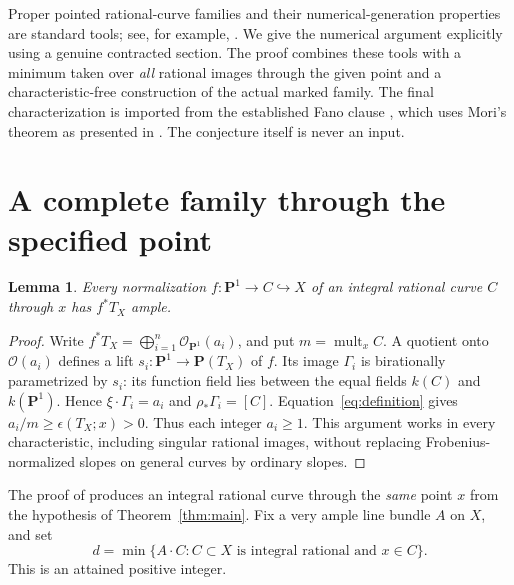 \documentclass[11pt]{article}
\newtheorem{lemma}[theorem]{Lemma}
\newcommand{\PP}{\mathbf P}
\newcommand{\OO}{\mathcal O}
\newcommand{\mult}{\operatorname{mult}}
\begin{document}
Proper pointed rational-curve families and their numerical-generation
properties are standard tools; see, for example,
\cite[Proposition 2.20(b)]{AO}. We give the numerical argument explicitly
using a genuine contracted section. The proof combines these tools with a
minimum taken over \emph{all} rational images through the given point and
a characteristic-free construction of the actual marked family.
The final characterization is imported from the established Fano clause
\cite[Proposition 4.8(1)]{FM}, which uses Mori's theorem as presented in
\cite[Theorem V.3.2]{Kollar}. The conjecture itself is never an input.

\section{A complete family through the specified point}

\begin{lemma}\label{lem:free}
Every normalization $f:\PP^1\to C\hookrightarrow X$ of an integral
rational curve $C$ through $x$ has $f^*T_X$ ample.
\end{lemma}
\begin{proof}
Write $f^*T_X=\bigoplus_{i=1}^n\OO_{\PP^1}(a_i)$, and put
$m=\mult_x C$. A quotient onto $\OO(a_i)$ defines a lift
$s_i:\PP^1\to\PP(T_X)$ of $f$. Its image $\Gamma_i$ is birationally
parametrized by $s_i$: its function field lies between the equal fields
$k(C)$ and $k(\PP^1)$. Hence
$\xi\cdot\Gamma_i=a_i$ and $\rho_*\Gamma_i=[C]$.
Equation~\eqref{eq:definition} gives
$a_i/m\geq\epsilon(T_X;x)>0$. Thus each integer $a_i\geq1$.
This argument works in every characteristic, including singular rational
images, without replacing Frobenius-normalized slopes on general curves
by ordinary slopes.
\end{proof}

The proof of \cite[Corollary 4.6]{FM} produces an integral rational curve
through the \emph{same} point $x$ from the hypothesis of
Theorem~\ref{thm:main}. Fix a very ample line bundle $A$ on $X$, and set
\begin{equation}\label{eq:minimum}
d=\min\{A\cdot C:C\subset X\text{ is integral rational and }x\in C\}.
\end{equation}
This is an attained positive integer.
\end{document}
